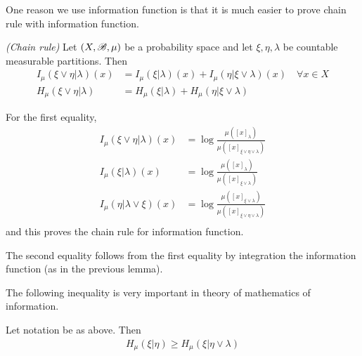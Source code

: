\documentclass[10pt,a4paper]{report}
\newenvironment{proof}
{\begin{changemargin}{1cm}{0.5cm} 
	}%
	{\end{changemargin}
}
\begin{document}
One reason we use information function is that it is much easier to prove chain rule with information function.
\s

\lem \emph{(Chain rule)} Let $(X,\mathscr{B}, \mu)$ be a probability space and let $\xi, \eta, \lambda$ be countable measurable partitions. Then
\begin{align*}
I_{\mu} (\xi \vee \eta | \lambda)(x) &= I_{\mu}(\xi | \lambda) (x) + I_{\mu}(\eta | \xi \vee \lambda)(x) \quad \forall x \in X \\
H_{\mu} (\xi \vee \eta | \lambda) &= H_{\mu}(\xi | \lambda)  + H_{\mu}(\eta | \xi \vee \lambda)
\end{align*}
\begin{proof}
\pf For the first equality,
\begin{align*}
I_{\mu} (\xi \vee \eta |\lambda) (x)  &= \log \frac{\mu ([x]_{\lambda})}{\mu([x]_{\xi \vee \eta \vee \lambda})} \\
I_{\mu} (\xi |\lambda) (x)  &= \log \frac{\mu ([x]_{\lambda})}{\mu([x]_{\xi \vee \lambda})} \\
I_{\mu} (\eta |\lambda \vee \xi) (x)  &= \log \frac{\mu ([x]_{\xi \vee \lambda})}{\mu([x]_{\xi \vee \eta \vee \lambda})} \\
\end{align*}
and this proves the chain rule for information function.

\quad The second equality follows from the first equality by integration the information function (as in the previous lemma).

\eop
\end{proof}
\s

The following inequality is very important in theory of mathematics of information.
\s

\lem Let notation be as above. Then
\begin{align*}
H_{\mu}(\xi | \eta) \geq H_{\mu}(\xi | \eta \vee \lambda)
\end{align*}
\end{document}
